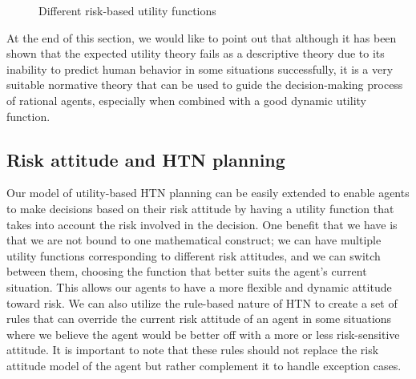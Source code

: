 \begin{figure}[H]
\begin{minipage}{.3\textwidth}
    \end{minipage}
    \hspace{1em}
    \begin{minipage}{.3\textwidth}
      \centering
    \end{minipage}
    \caption{Different risk-based utility functions}
    \label{fig:risk-based-utility}
\end{figure}

At the end of this section, we would like to point out that although it has been shown \cite{kahneman2013prospect} that the expected utility theory fails as a descriptive theory due to its inability to predict human behavior in some situations successfully, it is a very suitable normative theory that can be used to guide the decision-making process of rational agents, especially when combined with a good dynamic utility function.

\subsection{Risk attitude and HTN planning}
Our model of utility-based HTN planning can be easily extended to enable agents to make decisions based on their risk attitude by having a utility function that takes into account the risk involved in the decision. One benefit that we have is that we are not bound to one mathematical construct; we can have multiple utility functions corresponding to different risk attitudes, and we can switch between them, choosing the function that better suits the agent's current situation. This allows our agents to have a more flexible and dynamic attitude toward risk. We can also utilize the rule-based nature of HTN to create a set of rules that can override the current risk attitude of an agent in some situations where we believe the agent would be better off with a more or less risk-sensitive attitude. It is important to note that these rules should not replace the risk attitude model of the agent but rather complement it to handle exception cases.

